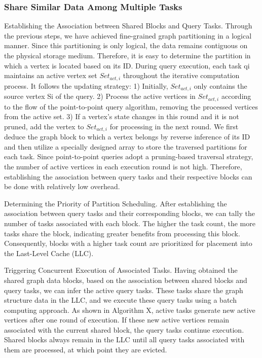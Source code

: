 \documentclass[lettersize,journal]{IEEEtran} %
\begin{document}
\subsubsection{Share Similar Data Among Multiple Tasks}

Establishing the Association between Shared Blocks and Query Tasks. Through the previous steps, we have achieved fine-grained graph partitioning in a logical manner. Since this partitioning is only logical, the data remains contiguous on the physical storage medium. Therefore, it is easy to determine the partition in which a vertex is located based on its ID. During query execution, each task qi maintains an active vertex set $Set_{act,i}$ throughout the iterative computation process. It follows the updating strategy: 1) Initially, $Set_{act,i}$ only contains the source vertex Si of the query. 2) Process the active vertices in $Set_{act,i}$ according to the flow of the point-to-point query algorithm, removing the processed vertices from the active set. 3) If a vertex's state changes in this round and it is not pruned, add the vertex to $Set_{act,i}$ for processing in the next round. We first deduce the graph block to which a vertex belongs by reverse inference of its ID and then utilize a specially designed array to store the traversed partitions for each task. Since point-to-point queries adopt a pruning-based traversal strategy, the number of active vertices in each execution round is not high. Therefore, establishing the association between query tasks and their respective blocks can be done with relatively low overhead.

Determining the Priority of Partition Scheduling. After establishing the association between query tasks and their corresponding blocks, we can tally the number of tasks associated with each block. The higher the task count, the more tasks share the block, indicating greater benefits from processing this block. Consequently, blocks with a higher task count are prioritized for placement into the Last-Level Cache (LLC).

Triggering Concurrent Execution of Associated Tasks. Having obtained the shared graph data blocks, based on the association between shared blocks and query tasks, we can infer the active query tasks. These tasks share the graph structure data in the LLC, and we execute these query tasks using a batch computing approach. As shown in Algorithm X, active tasks generate new active vertices after one round of execution. If these new active vertices remain associated with the current shared block, the query tasks continue execution. Shared blocks always remain in the LLC until all query tasks associated with them are processed, at which point they are evicted.
\end{document}
